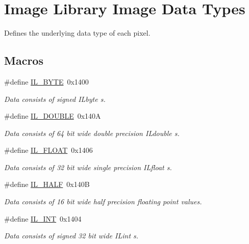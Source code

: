 \hypertarget{group__il__data__types}{\section{Image Library Image Data Types}
\label{group__il__data__types}
}


Defines the underlying data type of each pixel.  


\subsection*{Macros}
\begin{DoxyCompactItemize}
\item 
\#define \hyperlink{group__il__data__types_ga5a1e68002c5c3108e1fea27cb8b75330}{I\+L\+\_\+\+B\+Y\+T\+E}~0x1400
\begin{DoxyCompactList}\small\item\em Data consists of signed {\itshape I\+Lbyte} s. \end{DoxyCompactList}\item 
\#define \hyperlink{group__il__data__types_ga323d29d399cf86d66569ec044016c7dc}{I\+L\+\_\+\+D\+O\+U\+B\+L\+E}~0x140\+A
\begin{DoxyCompactList}\small\item\em Data consists of 64 bit wide double precision {\itshape I\+Ldouble} s. \end{DoxyCompactList}\item 
\#define \hyperlink{group__il__data__types_ga2e425183c13c5fef66fd02322798e11c}{I\+L\+\_\+\+F\+L\+O\+A\+T}~0x1406
\begin{DoxyCompactList}\small\item\em Data consists of 32 bit wide single precision {\itshape I\+Lfloat} s. \end{DoxyCompactList}\item 
\#define \hyperlink{group__il__data__types_ga321b96d628cff640093c7e5004999338}{I\+L\+\_\+\+H\+A\+L\+F}~0x140\+B
\begin{DoxyCompactList}\small\item\em Data consists of 16 bit wide half precision floating point values. \end{DoxyCompactList}\item 
\#define \hyperlink{group__il__data__types_ga6dd2fb48ea684fac690f06c5e83cb1a7}{I\+L\+\_\+\+I\+N\+T}~0x1404
\begin{DoxyCompactList}\small\item\em Data consists of signed 32 bit wide {\itshape I\+Lint} s. \end{DoxyCompactList}\item 

\end{DoxyCompactItemize}
